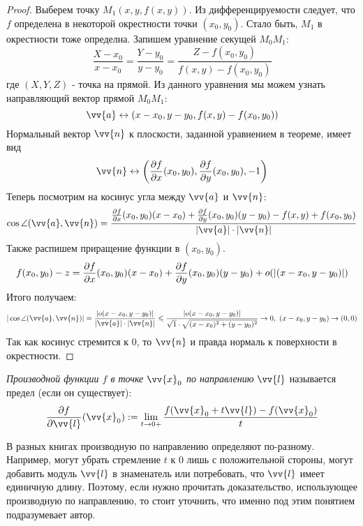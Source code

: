\begin{proof}
	Выберем точку $M_1(x, y, f(x, y))$. Из дифференцируемости следует, что $f$ определена в некоторой окрестности точки $(x_0, y_0)$. Стало быть, $M_1$ в окрестности тоже определна. Запишем уравнение секущей $M_0 M_1$:
	\[
		\frac{X - x_0}{x - x_0} = \frac{Y - y_0}{y - y_0} = \frac{Z - f(x_0, y_0)}{f(x, y) - f(x_0, y_0)}
	\]
	где $(X, Y, Z)$ - точка на прямой. Из данного уравнения мы можем узнать направляющий вектор прямой $M_0 M_1$:
	\[
		\vv{a} \leftrightarrow (x - x_0, y - y_0, f(x, y) - f(x_0, y_0))
	\]
	Нормальный вектор $\vv{n}$ к плоскости, заданной уравнением в теореме, имеет вид
	\[
		\vv{n} \leftrightarrow \left(\pd{f}{x} (x_0, y_0), \pd{f}{y} (x_0, y_0), -1\right)
	\]
	Теперь посмотрим на косинус угла между $\vv{a}$ и $\vv{n}$:
	\[
		\cos \angle (\vv{a}, \vv{n}) = \frac{\pd{f}{x} (x_0, y_0)(x - x_0) + \pd{f}{y} (x_0, y_0)(y - y_0) - f(x, y) + f(x_0, y_0)}{|\vv{a}|\cdot |\vv{n}|}%
	\]
	Также распишем приращение функции в $(x_0, y_0)$.
	\[
		f(x_0, y_0) - z = \frac{\partial f}{\partial x}(x_0, y_0)(x - x_0) + \frac{\partial f}{\partial y}(x_0, y_0)(y - y_0) + o(|(x - x_0, y - y_0)|)
	\]
	Итого получаем:
	\[
		|\cos \angle (\vv{a}, \vv{n})| = \frac{|o(x - x_0, y - y_0)|}{|\vv{a}|\cdot |\vv{n}|} \leq \frac{|o(x - x_0, y - y_0)|}{\sqrt{1} \cdot \sqrt{(x - x_0)^2 + (y - y_0)^2}} \to 0, \ (x - x_0, y - y_0) \to (0, 0)
	\]
	Так как косинус стремится к 0, то $\vv{n}$ и правда нормаль к поверхности в окрестности.
\end{proof}

\begin{definition}
	\textit{Производной функции $f$ в точке $\vv{x}_0$ по направлению} $\vv{l}$ называется предел (если он существует):
	\[
		\pd{f}{\vv{l}} (\vv{x}_0) := \liml_{t \to 0+} \frac{f(\vv{x}_0 + t\vv{l}) - f(\vv{x}_0)}{t}
	\]
\end{definition}

\begin{note}
	В разных книгах производную по направлению определяют по-разному. Например, могут убрать стремление $t$ к 0 лишь с положительной стороны, могут добавить модуль $\vv{l}$ в знаменатель или потребовать, что $\vv{l}$ имеет единичную длину. Поэтому, если нужно прочитать доказательство, использующее производную по направлению, то стоит уточнить, что именно под этим понятием подразумевает автор.
\end{note}

